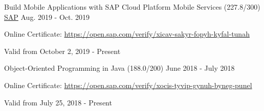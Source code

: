 
\begin{cventries}

\vspace{-0.25cm}

  \cventry
    {Build Mobile Applications with SAP Cloud Platform Mobile Services (227.8/300)} %
    {\href{https://www.sap.com/index.html}{SAP}} %
    {} %
    {Aug. 2019 - Oct. 2019} %
    {
	    \begin{cvitems} %
        \item[] {Online Certificate: \url{https://open.sap.com/verify/xicav-sakyr-fopyh-kyfal-tunah}} %
        \item[] {Valid from October 2, 2019 - Present} %
      \end{cvitems}
    }
    \vspace{-0.1cm}
  \cventry
    {Object-Oriented Programming in Java (188.0/200)} %
    {} %
    {} %
    {June 2018 - July 2018} %
    {
	    \begin{cvitems} %
        \item[] {Online Certificate: \url{https://open.sap.com/verify/xocis-tyvip-gynuh-byneg-punel}} %
        \item[] {Valid from July 25, 2018 - Present} %
      \end{cvitems}
    }   
    \vspace{-0.1cm}

\end{cventries}
